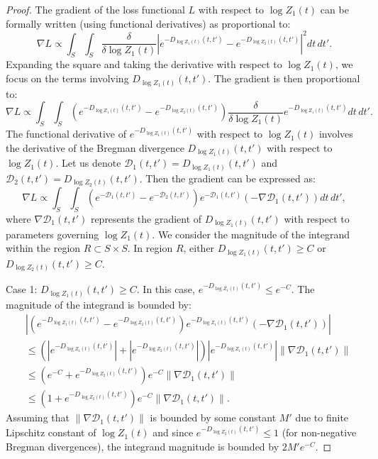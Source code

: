 \documentclass{article}
\theoremstyle{plain}
\theoremstyle{definition}
\theoremstyle{remark}
\begin{document}
\begin{proof}
The gradient of the loss functional $L$ with respect to $\log Z_{1}(t)$ can be formally written (using functional derivatives) as proportional to:
\begin{equation}
    \nabla L \propto \int_{S} \int_{S} \frac{\delta}{\delta \log Z_{1}(t)} \left| e^{-D_{\log Z_{1}(t)}(t,t')} - e^{-D_{\log Z_{2}(t)}(t,t')} \right|^{2} dt \, dt'.
\end{equation}
Expanding the square and taking the derivative with respect to $\log Z_{1}(t)$, we focus on the terms involving $D_{\log Z_{1}(t)}(t,t')$. The gradient is then proportional to:
\begin{equation}
    \nabla L \propto \int_{S} \int_{S} \left( e^{-D_{\log Z_{1}(t)}(t,t')} - e^{-D_{\log Z_{2}(t)}(t,t')} \right) \frac{\delta}{\delta \log Z_{1}(t)} e^{-D_{\log Z_{1}(t)}(t,t')} dt \, dt'.
\end{equation}
The functional derivative of $e^{-D_{\log Z_{1}(t)}(t,t')}$ with respect to $\log Z_{1}(t)$ involves the derivative of the Bregman divergence $D_{\log Z_{1}(t)}(t,t')$ with respect to $\log Z_{1}(t)$.  Let us denote $\mathcal{D}_{1}(t,t') = D_{\log Z_{1}(t)}(t,t')$ and $\mathcal{D}_{2}(t,t') = D_{\log Z_{2}(t)}(t,t')$. Then the gradient can be expressed as:
\begin{equation}
    \nabla L \propto \int_{S} \int_{S} \left( e^{-\mathcal{D}_{1}(t,t')} - e^{-\mathcal{D}_{2}(t,t')} \right) e^{-\mathcal{D}_{1}(t,t')} (-\nabla \mathcal{D}_{1}(t,t')) dt \, dt',
\end{equation}
where $\nabla \mathcal{D}_{1}(t,t')$ represents the gradient of $D_{\log Z_{1}(t)}(t,t')$ with respect to parameters governing $\log Z_{1}(t)$.  We consider the magnitude of the integrand within the region $R \subset S \times S$. In region $R$, either $D_{\log Z_{1}(t)}(t,t') \geq C$ or $D_{\log Z_{2}(t)}(t,t') \geq C$.

Case 1: $D_{\log Z_{1}(t)}(t,t') \geq C$. In this case, $e^{-D_{\log Z_{1}(t)}(t,t')} \leq e^{-C}$. The magnitude of the integrand is bounded by:
\begin{align*}
    & \left| \left( e^{-D_{\log Z_{1}(t)}(t,t')} - e^{-D_{\log Z_{2}(t)}(t,t')} \right) e^{-D_{\log Z_{1}(t)}(t,t')} (-\nabla \mathcal{D}_{1}(t,t')) \right| \\
    & \leq \left( |e^{-D_{\log Z_{1}(t)}(t,t')}| + |e^{-D_{\log Z_{2}(t)}(t,t')}| \right) |e^{-D_{\log Z_{1}(t)}(t,t')}| \|\nabla \mathcal{D}_{1}(t,t')\| \\
    & \leq \left( e^{-C} + e^{-D_{\log Z_{2}(t)}(t,t')} \right) e^{-C} \|\nabla \mathcal{D}_{1}(t,t')\| \\
    & \leq (1 + e^{-D_{\log Z_{2}(t)}(t,t')}) e^{-C} \|\nabla \mathcal{D}_{1}(t,t')\|.
\end{align*}
Assuming that $\|\nabla \mathcal{D}_{1}(t,t')\|$ is bounded by some constant $M'$ due to finite Lipschitz constant of $\log Z_{1}(t)$ and since $e^{-D_{\log Z_{2}(t)}(t,t')} \leq 1$ (for non-negative Bregman divergences), the integrand magnitude is bounded by $2 M' e^{-C}$.


\end{proof}
\end{document}
